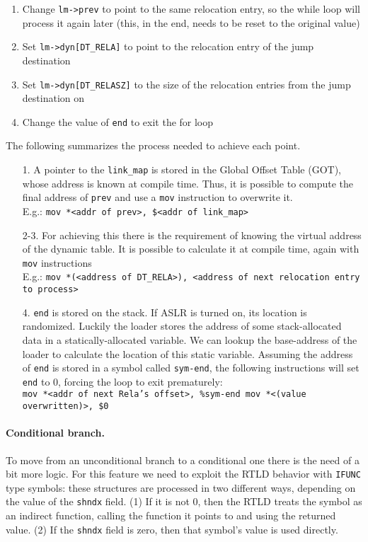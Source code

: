 \documentclass[11pt,twoside,a4paper]{article}
\begin{document}
\begin{enumerate}
\item Change \texttt{lm->prev} to point to the same relocation entry, so the while loop will process it again later (this, in the end, needs to be reset to the original value)
\item Set \texttt{lm->dyn[DT\_RELA]} to point to the relocation entry of the jump destination
\item Set \texttt{lm->dyn[DT\_RELASZ]} to the size of the relocation entries from the jump destination on
\item Change the value of \texttt{end} to exit the for loop
\end{enumerate}


The following summarizes the process needed to achieve each point.

\begin{itemize}
  \item[1.] A pointer to the \texttt{link\_map} is stored in the Global Offset Table (GOT), whose address is known at compile time. Thus, it is possible to compute the final address of \texttt{prev} and use a \texttt{mov} instruction to overwrite it. \\ E.g.: \texttt{mov *<addr of prev>, \$<addr of link\_map>}
  \item[2-3.] For achieving this there is the requirement of knowing the virtual address of the dynamic table. It is possible to calculate it at compile time, again with \texttt{mov} instructions \\ E.g.: \texttt{mov *(<address of DT\_RELA>), <address of next relocation entry to process>}
  \item[4.] \texttt{end} is stored on the stack. If ASLR is turned on, its location is randomized. Luckily the loader stores the address of some stack-allocated data in a statically-allocated variable. We can lookup the base-address of the loader to calculate the location of this static variable. Assuming the
address of \texttt{end} is stored in a symbol called \texttt{sym-end}, the following instructions will set \texttt{end} to 0, forcing the loop to exit prematurely: \\
 \texttt{mov *<addr of next Rela's offset>, \%sym-end mov *<(value overwritten)>, \$0}
\end{itemize}

\paragraph{Conditional branch.} To move from an unconditional branch to a conditional one there is the need of a bit more logic. For this feature we need to exploit the RTLD behavior with \texttt{IFUNC} type symbols: these structures are processed in two different ways, depending on the value of the \texttt{shndx} field. (1) If it is not 0, then the RTLD treats the symbol as an indirect function, calling the function it points to and using the returned value. (2) If the \texttt{shndx} field is zero, then that symbol's value is used directly.
\end{document}
